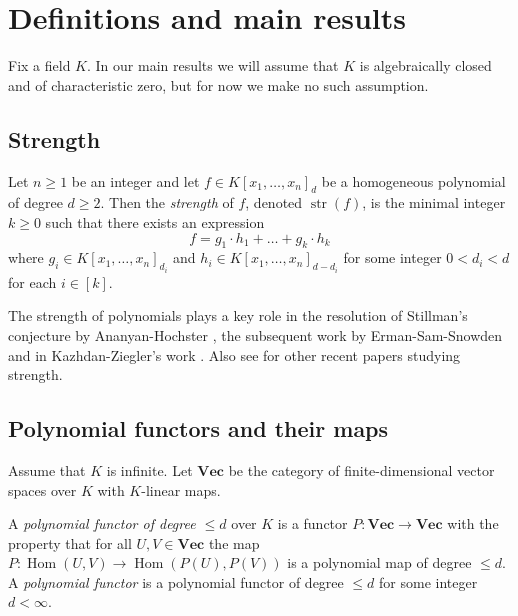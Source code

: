 \documentclass{amsart}
\theoremstyle{plain}
\theoremstyle{definition}
\DeclareMathOperator{\str}{str}
\DeclareMathOperator{\Hom}{Hom}
\renewcommand{\Vec}{\mathbf{Vec}}
\begin{document}
\section{Definitions and main results} \label{sec:def&res}

Fix a field $K$. In our main results we will assume that $K$ is
algebraically closed and of characteristic zero, but for now we make
no such assumption.

\subsection{Strength}

\begin{de} \label{de:Strength}
Let $n\geq 1$ be an integer and let $f \in K[x_1,\ldots,x_n]_d$ be a
homogeneous polynomial of degree $d\geq 2$. Then the {\em strength} of $f$,
denoted $\str(f)$, is the minimal integer $k\geq0$ such that there exists an
expression
\[
f= g_1\cdot h_1+\ldots+ g_k\cdot h_k
\]
where $g_i \in K[x_1,\ldots,x_n]_{d_i}$ and $h_i \in K[x_1,\ldots,x_n]_{d-d_i}$ for some integer $0<d_i<d$ for each $i\in[k]$.
\end{de}

The strength of polynomials plays a key role in the resolution of Stillman's
conjecture by Ananyan-Hochster \cite{AH:stillmanconj,AH:stillmanbounds},
the subsequent work by Erman-Sam-Snowden \cite{ESS:bigpoly,
ESS:strengthhartshorneconj,ESS:bigpoly2} and in Kazhdan-Ziegler's work \cite{KZ:strength1,KZ:strength2}. Also see \cite{BBOV:strengthnotclosed,
BBOV:strengthgen2,BV:strengthline,BDE:boundedstrength,BO:strengthgen1,
DES:noethcubic} for other recent papers studying strength.

\subsection{Polynomial functors and their maps}

Assume that $K$ is infinite.
Let $\Vec$ be the category of finite-dimensional vector spaces over $K$
with $K$-linear maps.

\begin{de}
A {\em polynomial functor of degree $\leq d$} over $K$ is a functor
$P\colon\Vec \to \Vec$ with the property that for all $U,V \in \Vec$ the map
$P\colon\Hom(U,V) \to \Hom(P(U),P(V))$ is a polynomial map of degree
$\leq d$. A {\em polynomial functor} is a polynomial functor of degree
$\leq d$ for some integer $d<\infty$.
\end{de}
\end{document}
